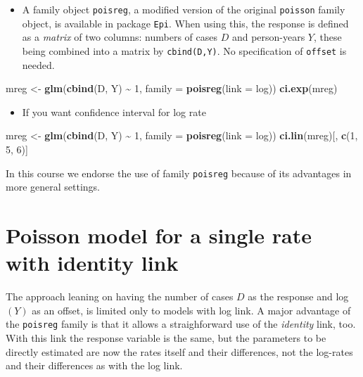 \documentclass[
]{book}
\newenvironment{Shaded}{\begin{snugshade}}{\end{snugshade}}
\newcommand{\AttributeTok}[1]{\textcolor[rgb]{0.13,0.29,0.53}{#1}}
\newcommand{\DecValTok}[1]{\textcolor[rgb]{0.00,0.00,0.81}{#1}}
\newcommand{\FunctionTok}[1]{\textcolor[rgb]{0.13,0.29,0.53}{\textbf{#1}}}
\newcommand{\NormalTok}[1]{#1}
\newcommand{\OtherTok}[1]{\textcolor[rgb]{0.56,0.35,0.01}{#1}}
\newcommand{\SpecialCharTok}[1]{\textcolor[rgb]{0.81,0.36,0.00}{\textbf{#1}}}
\providecommand{\tightlist}{%
  \setlength{\itemsep}{0pt}\setlength{\parskip}{0pt}}
\begin{document}
\begin{itemize}
\tightlist
\item
  A family object \texttt{poisreg}, a modified version of the original \texttt{poisson} family object, is available
  in package \texttt{Epi}. When using this, the response is defined as a \emph{matrix} of two columns: numbers
  of cases \(D\) and person-years \(Y\), these being combined into a matrix by \texttt{cbind(D,Y)}. No specification
  of \texttt{offset} is needed.
\end{itemize}

\begin{Shaded}
\begin{Highlighting}[]
\NormalTok{mreg }\OtherTok{\textless{}{-}} \FunctionTok{glm}\NormalTok{(}\FunctionTok{cbind}\NormalTok{(D, Y) }\SpecialCharTok{\textasciitilde{}} \DecValTok{1}\NormalTok{, }\AttributeTok{family =} \FunctionTok{poisreg}\NormalTok{(}\AttributeTok{link =}\NormalTok{ log))}
\FunctionTok{ci.exp}\NormalTok{(mreg)}
\end{Highlighting}
\end{Shaded}

\begin{itemize}
\tightlist
\item
  If you want confidence interval for log rate
\end{itemize}

\begin{Shaded}
\begin{Highlighting}[]
\NormalTok{mreg }\OtherTok{\textless{}{-}} \FunctionTok{glm}\NormalTok{(}\FunctionTok{cbind}\NormalTok{(D, Y) }\SpecialCharTok{\textasciitilde{}} \DecValTok{1}\NormalTok{, }\AttributeTok{family =} \FunctionTok{poisreg}\NormalTok{(}\AttributeTok{link =}\NormalTok{ log))}
\FunctionTok{ci.lin}\NormalTok{(mreg)[, }\FunctionTok{c}\NormalTok{(}\DecValTok{1}\NormalTok{, }\DecValTok{5}\NormalTok{, }\DecValTok{6}\NormalTok{)]}
\end{Highlighting}
\end{Shaded}

In this course we endorse the use of family \texttt{poisreg} because of its advantages in more general settings.

\section{Poisson model for a single rate with identity link}\label{poisson-model-for-a-single-rate-with-identity-link}

The approach leaning on having the number of cases \(D\) as the response and log\((Y)\) as an offset,
is limited only to models with log link. A major advantage of the \texttt{poisreg} family is that it allows
a straighforward use of the \emph{identity} link, too. With this link the response variable is the same, but
the parameters to be directly estimated are now the rates itself and their differences, not the log-rates
and their differences as with the log link.
\end{document}
